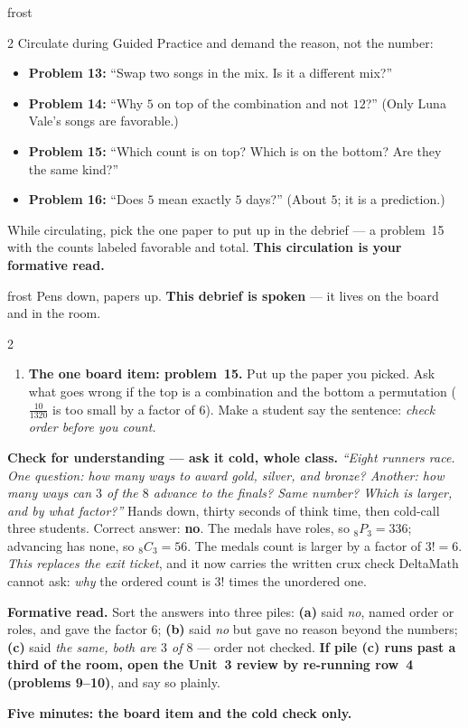 \documentclass[10pt]{article}
\newcommand{\Pnr}[2]{{}_{#1}P_{#2}}
\newcommand{\Cnr}[2]{{}_{#1}C_{#2}}
\begin{document}
\begin{skillbox}{frost}
\begin{multicols}{2}
Circulate during Guided Practice and demand the reason, not the number:
\begin{itemize}[leftmargin=1.1em, nosep]
  \item \textbf{Problem 13:} ``Swap two songs in the mix. Is it a different mix?''
  \item \textbf{Problem 14:} ``Why $5$ on top of the combination and not $12$?'' (Only Luna
        Vale's songs are favorable.)
  \item \textbf{Problem 15:} ``Which count is on top? Which is on the bottom? Are they the same
        kind?''
  \item \textbf{Problem 16:} ``Does $5$ mean exactly $5$ days?'' (About $5$; it is a
        prediction.)
\end{itemize}
While circulating, pick the one paper to put up in the debrief --- a problem~15 with the
counts labeled favorable and total. \textbf{This circulation is your formative read.}
\end{multicols}
\end{skillbox}

\boxguard[24]
\begin{skillbox}{frost}
Pens down, papers up. \textbf{This debrief is spoken} --- it lives on the board and in the room.
\begin{multicols}{2}
\begin{enumerate}[leftmargin=1.3em, nosep, itemsep=3pt]
  \item \textbf{The one board item: problem~15.} Put up the paper you picked. Ask what goes
        wrong if the top is a combination and the bottom a permutation
        ($\frac{10}{1320}$ is too small by a factor of $6$). Make a student say the sentence:
        \emph{check order before you count.}
\end{enumerate}
\columnbreak
\textbf{Check for understanding --- ask it cold, whole class.} \emph{``Eight runners race. One
question: how many ways to award gold, silver, and bronze? Another: how many ways can $3$ of
the $8$ advance to the finals? Same number? Which is larger, and by what factor?''} Hands down,
thirty seconds of think time, then cold-call three students. Correct answer: \textbf{no}. The
medals have roles, so $\Pnr{8}{3} = 336$; advancing has none, so $\Cnr{8}{3} = 56$. The medals
count is larger by a factor of $3! = 6$. \emph{This replaces the exit ticket}, and it now
carries the written crux check DeltaMath cannot ask: \emph{why} the ordered count is $3!$
times the unordered one.

\textbf{Formative read.} Sort the answers into three piles: \textbf{(a)} said \emph{no}, named
order or roles, and gave the factor $6$; \textbf{(b)} said \emph{no} but gave no reason beyond
the numbers; \textbf{(c)} said \emph{the same, both are $3$ of $8$} --- order not checked.
\textbf{If pile (c) runs past a third of the room, open the Unit~3 review by re-running row~4
(problems 9--10)}, and say so plainly.

\textbf{Five minutes: the board item and the cold check only.}
\end{multicols}
\end{skillbox}
\end{document}
